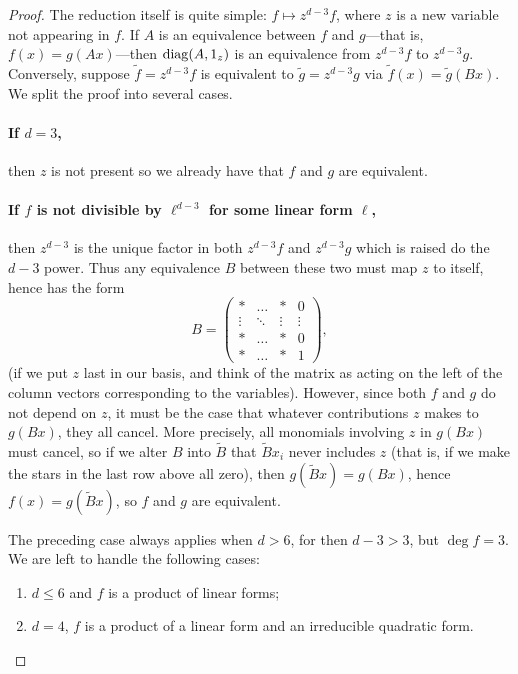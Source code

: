 \documentclass[11pt]{article}
\begin{document}
\begin{proof}
The reduction itself is quite simple: $f \mapsto z^{d-3} f$, where $z$ is a new variable not appearing in $f$. If $A$ is an equivalence between $f$ and $g$---that is, $f(x) = g(Ax)$---then $\operatorname{diag}(A, 1_z)$ is an equivalence from $z^{d-3} f$ to $z^{d-3}g$. Conversely, suppose $\tilde f = z^{d-3} f$ is equivalent to $\tilde g = z^{d-3} g$ via $\tilde f(x) = \tilde g(Bx)$. We split the proof into several cases. 

\paragraph{If $d=3$,} then $z$ is not present so we already have that $f$ and $g$ are equivalent.

\paragraph{If $f$ is not divisible by $\ell^{d-3}$ for some linear form $\ell$,} then $z^{d-3}$ is the unique factor in both $z^{d-3} f$ and $z^{d-3} g$ which is raised do the $d-3$ power. Thus any equivalence $B$ between these two must map $z$ to itself, hence has the form
\[
B = \left(\begin{array}{ccc|c}
* & \dotsc & * & 0 \\
\vdots & \ddots & \vdots & \vdots \\
* & \dotsc & * & 0 \\ \hline
* & \dotsc & * & 1
\end{array}\right),
\]
(if we put $z$ last in our basis, and think of the matrix as acting on the left of the column vectors corresponding to the variables). However, since both $f$ and $g$ do not depend on $z$, it must be the case that whatever contributions $z$ makes to $g(Bx)$, they all cancel. More precisely, all monomials involving $z$ in $g(Bx)$ must cancel, so if we alter $B$ into $\tilde B$ that $\tilde Bx_i$ never includes $z$ (that is, if we make the stars in the last row above all zero), then $g(\tilde B x) = g(Bx)$, hence $f(x) = g(\tilde Bx)$, so $f$ and $g$ are equivalent.

The preceding case always applies when $d > 6$, for then $d-3 > 3$, but $\deg f = 3$. We are left to handle the following cases:
\begin{enumerate}
\item $d \leq 6$ and $f$ is a product of linear forms;
\item $d=4$, $f$ is a product of a linear form and an irreducible quadratic form.
\end{enumerate}


\end{proof}
\end{document}
